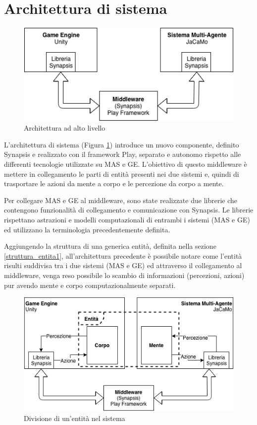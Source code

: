 \section{Architettura di sistema} \label{architettura_sistema}

\begin{figure}[H]
   \centering
   \includegraphics[width=0.8\linewidth]{figures/Architettura_alto_livello.png}
   \caption{Architettura ad alto livello}
   \label{architettura_alto_livello}
\end{figure}

L'architettura di sistema (Figura \ref{architettura_alto_livello}) introduce un nuovo componente, definito Synapsis e realizzato con il framework Play, separato e autonomo rispetto alle differenti tecnologie utilizzate su MAS e GE. L'obiettivo di questo middleware è mettere in collegamento le parti di entità presenti nei due sistemi e, quindi di trasportare le azioni da mente a corpo e le percezione da corpo a mente.

\medskip

Per collegare MAS e GE al middleware, sono state realizzate due librerie che contengono funzionalità di collegamento e comunicazione con Synapsis. Le librerie rispettano astrazioni e modelli computazionali di entrambi i sistemi (MAS e GE) ed utilizzano la terminologia precedentemente definita.

\medskip

Aggiungendo la struttura di una generica entità, definita nella sezione \ref{struttura_entita1}, all'architettura precedente è possibile notare come l'entità risulti suddivisa tra i due sistemi (MAS e GE) ed attraverso il collegamento al middleware, venga reso possibile lo scambio di informazioni (percezioni, azioni) pur avendo mente e corpo computazionalmente separati.

\begin{figure}[H]
   \centering
   \includegraphics[width=\linewidth]{figures/Middleware_entity.png}
   \caption{Divisione di un'entità nel sistema}
\end{figure}

